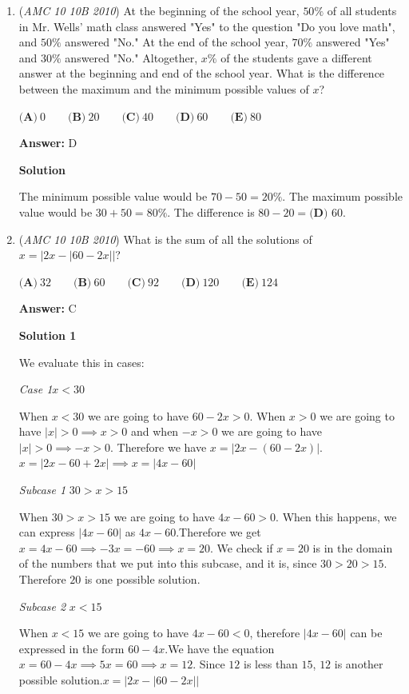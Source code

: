 \begin{enumerate}
	\item (\textit{AMC 10 10B 2010}) At the beginning of the school year, $50\%$ of all students in Mr. Wells' math class answered "Yes" to the question "Do you love math", and $50\%$ answered "No." At the end of the school year, $70\%$ answered "Yes" and $30\%$ answered "No." Altogether, $x\%$ of the students gave a different answer at the beginning and end of the school year. What is the difference between the maximum and the minimum possible values of $x$?


 $\textbf{(A)}\ 0 \qquad \textbf{(B)}\ 20 \qquad \textbf{(C)}\ 40 \qquad \textbf{(D)}\ 60 \qquad \textbf{(E)}\ 80$

 \textbf{Answer: }D



\textbf{Solution}

The minimum possible value would be $70 - 50 = 20\%$. The maximum possible value would be $30 + 50 = 80\%$. The difference is $80 - 20 = \boxed{\textbf{(D) }60}$.

 


	\item (\textit{AMC 10 10B 2010}) What is the sum of all the solutions of $x = \left|2x-|60-2x|\right|$?


 $\textbf{(A)}\ 32 \qquad \textbf{(B)}\ 60 \qquad \textbf{(C)}\ 92 \qquad \textbf{(D)}\ 120 \qquad \textbf{(E)}\ 124$

 \textbf{Answer: }C



\textbf{Solution 1}

We evaluate this in cases:

 \textit{Case 1}$x<30$ 

 When $x<30$ we are going to have $60-2x>0$.  When $x>0$ we are going to have $|x|>0\implies x>0$ and when $-x>0$ we are going to have $|x|>0\implies -x>0$.  Therefore we have $x=|2x-(60-2x)|$.$x=|2x-60+2x|\implies x=|4x-60|$

 \textit{Subcase 1 }$30>x>15$

 When $30>x>15$ we are going to have $4x-60>0$. When this happens, we can express $|4x-60|$ as $4x-60$.Therefore we get $x=4x-60\implies -3x=-60\implies x=20$.  We check if $x=20$ is in the domain of the numbers that we put into this subcase, and it is, since $30>20>15$. Therefore $20$ is one possible solution.  

 \textit{ Subcase 2 } $x<15$

 When $x<15$ we are going to have $4x-60<0$, therefore $|4x-60|$ can be expressed in the form $60-4x$.We have the equation $x=60-4x\implies 5x=60\implies x=12$.  Since $12$ is less than $15$, $12$ is another possible solution.$x=|2x-|60-2x||$


\end{enumerate}
